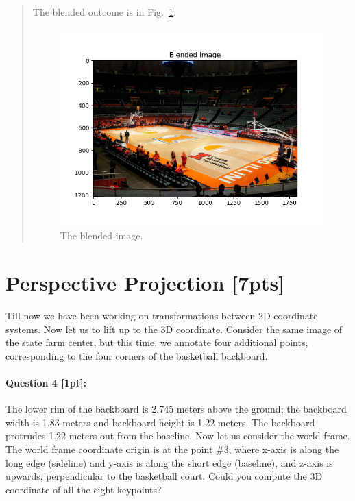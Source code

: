 \documentclass[11pt]{article}
\begin{document}
\begin{itemize}
\begin{quote}
    The blended outcome is in Fig.~\ref{fig:blended_image}.
    \begin{figure}[h]
        \centering
        \includegraphics[width=0.7\linewidth]{../mp1/imgs/Q3-C.png}
        \caption{The blended image.}
        \label{fig:blended_image}
    \end{figure}

\end{quote}

\end{itemize}

\clearpage

\section*{Perspective Projection [7pts]}
Till now we have been working on transformations between 2D coordinate systems. Now let us to lift up to the 3D coordinate. Consider the same image of the state farm center, but this time, we annotate four additional points, corresponding to the four corners of the basketball backboard. 

\paragraph{Question 4 [1pt]:} 
The lower rim of the backboard is 2.745 meters above the ground; the backboard width is 1.83 meters and backboard height is 1.22 meters. The backboard protrudes 1.22 meters out from the baseline. Now let us consider the world frame. The world frame coordinate origin is at the point \#3, where x-axis is along the long edge (sideline) and y-axis is along the short edge (baseline), and z-axis is upwards, perpendicular to the basketball court.   Could you compute the 3D coordinate of all the eight keypoints?
\end{document}
